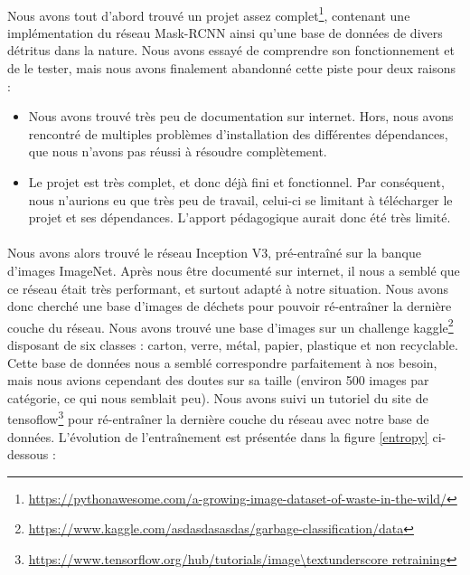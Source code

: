\documentclass[12pt,a4paper,twocolumn]{article}
\begin{document}
\paragraph*{}

Nous avons tout d’abord trouvé un projet assez complet\footnote{\url{https://pythonawesome.com/a-growing-image-dataset-of-waste-in-the-wild/}}, contenant une implémentation du réseau Mask-RCNN ainsi qu’une base de données de divers détritus dans la nature. Nous avons essayé de comprendre son fonctionnement et de le tester, mais nous avons finalement abandonné cette piste pour deux raisons :

\begin{itemize}
  \item Nous avons trouvé très peu de documentation sur internet. Hors, nous avons rencontré de multiples problèmes d’installation des différentes dépendances, que nous n’avons pas réussi à résoudre complètement.
  \item Le projet est très complet, et donc déjà fini et fonctionnel. Par conséquent, nous n’aurions eu que très peu de travail, celui-ci se limitant à télécharger le projet et ses dépendances. L'apport pédagogique aurait donc été très limité.
\end{itemize}

\paragraph*{}

Nous avons alors trouvé le réseau Inception V3, pré-entraîné sur la banque d’images ImageNet. Après nous être documenté sur internet, il nous a semblé que ce réseau était très performant, et surtout adapté à notre situation.
Nous avons donc cherché une base d’images de déchets pour pouvoir ré-entraîner la dernière couche du réseau. Nous avons trouvé une base d’images sur un challenge kaggle\footnote{\url{https://www.kaggle.com/asdasdasasdas/garbage-classification/data}} disposant de six classes : carton, verre, métal, papier, plastique et non recyclable. Cette base de données nous a semblé correspondre parfaitement à nos besoin, mais nous avions cependant des doutes sur sa taille (environ 500 images par catégorie, ce qui nous semblait peu).
Nous avons suivi un tutoriel du site de tensoflow\footnote{\url{https://www.tensorflow.org/hub/tutorials/image\textunderscore retraining}} pour ré-entraîner la dernière couche du réseau avec notre base de données. L'évolution de l'entraînement est présentée dans la figure \ref{entropy} ci-dessous :
\end{document}
